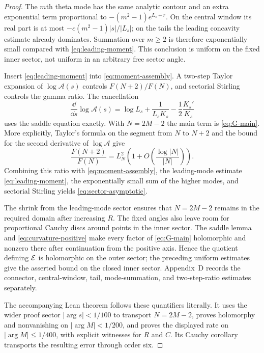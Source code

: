 \documentclass[12pt]{article}
\begin{document}
\begin{proof}
The $m$th theta mode has the same analytic contour and an extra exponential
term proportional to $-(m^2-1)e^{L_s+r}$.  On the central window its real
part is at most $-c(m^2-1)|s|/|L_s|$; on the tails the leading concavity
estimate already dominates.  Summation over $m\ge2$ is therefore
exponentially small compared with \eqref{eq:leading-moment}.  This conclusion
is uniform on the fixed inner sector, not uniform in an arbitrary free sector
angle.

Insert \eqref{eq:leading-moment} into \eqref{eq:moment-assembly}.  A two-step
Taylor expansion of $\log\mathcal A(s)$ controls $F(N+2)/F(N)$, and sectorial
Stirling controls the gamma ratio.  The cancellation
\begin{equation}\label{eq:logA-derivative}
\frac{\dd}{\dd s}\log\mathcal A(s)
 =\log L_s+\frac1{L_sK_s}-\frac12\frac{K_s'}{K_s}
\end{equation}
uses the saddle equation exactly.  With $N=2M-2$ the main term is
\eqref{eq:G-main}.  More explicitly, Taylor's formula on the segment from
$N$ to $N+2$ and the bound for the second derivative of
$\log\mathcal A$ give
\[
 \frac{F(N+2)}{F(N)}=L_N^2
 \left(1+O\left(\frac{\log|N|}{|N|}\right)\right).
\]
Combining this ratio with \eqref{eq:moment-assembly}, the leading-mode
estimate \eqref{eq:leading-moment}, the exponentially small sum of the
higher modes, and sectorial Stirling yields \eqref{eq:sector-asymptotic}.

The shrink from the leading-mode sector ensures that $N=2M-2$ remains in
the required domain after increasing $R$.  The fixed angles also leave room
for proportional Cauchy discs around points in the inner sector.  The
saddle lemma and \eqref{eq:curvature-positive} make every factor of
\eqref{eq:G-main} holomorphic and nonzero there after continuation from the
positive axis.  Hence the quotient defining $\mathcal E$ is holomorphic on the
outer sector; the preceding uniform estimates give the asserted bound on
the closed inner sector.  Appendix~D records the connector, central-window,
tail, mode-summation, and two-step-ratio estimates separately.

The accompanying Lean theorem follows these quantifiers literally.  It uses
the wider proof sector $|\arg s|<1/100$ to transport $N=2M-2$, proves
holomorphy and nonvanishing on $|\arg M|<1/200$, and proves the displayed
rate on $|\arg M|\le 1/400$, with explicit witnesses for $R$ and $C$.
Its Cauchy corollary transports the resulting error through order six.
\end{proof}
\end{document}
